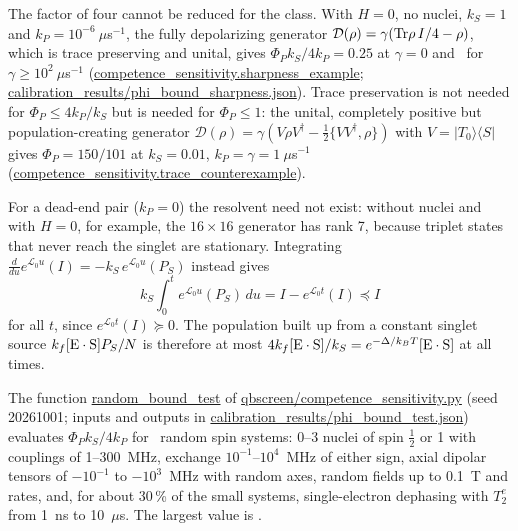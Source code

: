 \documentclass[11pt]{article}
\begin{document}
The factor of four cannot be reduced for the class. With $H=0$, no nuclei,
$k_S = 1$ and $k_P = 10^{-6}~\mu$s$^{-1}$, the fully depolarizing generator
$\mathcal D(\rho) = \gamma({\rm Tr}\rho\,I/4-\rho)$, which is trace preserving
and unital, gives $\Phi_Pk_S/4k_P = 0.25$ at $\gamma=0$ and \sharpRatio\ for
$\gamma\ge10^2~\mu$s$^{-1}$ (\url{competence_sensitivity.sharpness_example};
\url{calibration_results/phi_bound_sharpness.json}). Trace preservation is not
needed for $\Phi_P\le4k_P/k_S$ but is needed for $\Phi_P\le1$: the unital,
completely positive but population-creating generator
$\mathcal D(\rho) = \gamma(V\rho V^\dagger-\tfrac12\{VV^\dagger,\rho\})$ with
$V = |T_0\rangle\langle S|$ gives $\Phi_P = 150/101$ at $k_S = 0.01$,
$k_P = \gamma = 1~\mu$s$^{-1}$ (\url{competence_sensitivity.trace_counterexample}).

For a dead-end pair ($k_P=0$) the resolvent need not exist: without nuclei and
with $H=0$, for example, the $16\times16$ generator has rank 7, because triplet
states that never reach the singlet are stationary. Integrating
$\frac{d}{du}e^{\mathcal L_0u}(I) = -k_S\,e^{\mathcal L_0u}(P_S)$ instead gives
\begin{equation}
k_S\int_0^t e^{\mathcal L_0u}(P_S)\,du = I - e^{\mathcal L_0t}(I) \preceq I
\end{equation}
for all $t$, since $e^{\mathcal L_0t}(I)\succeq0$. The population built up from a
constant singlet source $k_f[{\rm E\cdot S}]P_S/N$ is therefore at most
$4k_f[{\rm E\cdot S}]/k_S = e^{-\Delta/k_BT}[{\rm E\cdot S}]$ at all times.

The function \url{random_bound_test} of \url{qbscreen/competence_sensitivity.py}
(seed 20261001; inputs and outputs in \url{calibration_results/phi_bound_test.json}) evaluates
$\Phi_Pk_S/4k_P$ for \nBoundTest\ random spin systems: 0--3 nuclei of spin
$\tfrac12$ or 1 with couplings of 1--300~MHz, exchange $10^{-1}$--$10^4$~MHz of
either sign, axial dipolar tensors of $-10^{-1}$ to $-10^{3}$~MHz with random
axes, random fields up to 0.1~T and rates, and, for about 30\,\% of the small
systems, single-electron dephasing with $T_2^e$ from 1~ns to 10~$\mu$s. The
largest value is \maxBoundRatio.
\end{document}
